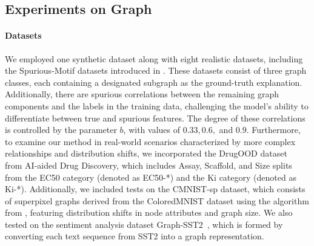 % 

\subsection{Experiments on Graph}
\label{sec: graph exp}


\paragraph{Datasets} 
We employed one synthetic dataset along with eight realistic datasets, including the Spurious-Motif datasets introduced in \cite{dir}. 
These datasets consist of three graph classes, each containing a designated subgraph as the ground-truth explanation. Additionally, there are spurious correlations between the remaining graph components and the labels in the training data, challenging the model's ability to differentiate between true and spurious features. 
The degree of these correlations is controlled by the parameter \( b \), with values of \( 0.33, 0.6, \) and \( 0.9 \). 
Furthermore, to examine our method in real-world scenarios characterized by more complex relationships and distribution shifts, we incorporated the DrugOOD dataset~\citep{drugood} from AI-aided Drug Discovery, which includes Assay, Scaffold, and Size splits from the EC50 category (denoted as EC50-*) and the Ki category (denoted as Ki-*). 
Additionally, we included tests on the CMNIST-sp dataset, which consists of superpixel graphs derived from the ColoredMNIST dataset using the algorithm from \cite{understand_att}, featuring distribution shifts in node attributes and graph size. We also tested on the sentiment analysis dataset Graph-SST2~\citep{graph-sst2}, which is formed by converting each text sequence from SST2 into a graph representation. 


